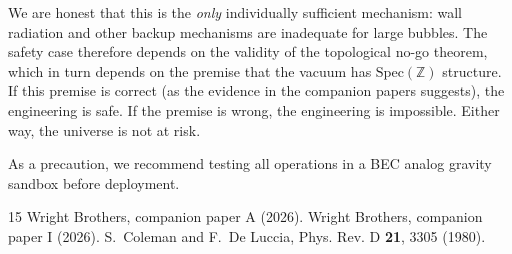 \documentclass[11pt,a4paper]{article}
\newcommand{\Spec}{\mathrm{Spec}}
\begin{document}
We are honest that this is the \emph{only} individually sufficient
mechanism: wall radiation and other backup mechanisms are
inadequate for large bubbles. The safety case therefore depends
on the validity of the topological no-go theorem, which in turn
depends on the premise that the vacuum has $\Spec(\mathbb{Z})$
structure. If this premise is correct (as the evidence in
the companion papers suggests), the engineering is safe.
If the premise is wrong, the engineering is impossible.
Either way, the universe is not at risk.

As a precaution, we recommend testing all operations in a BEC
analog gravity sandbox before deployment.

\begin{thebibliography}{15}
 Wright Brothers, companion paper A (2026).
 Wright Brothers, companion paper I (2026).
 S.~Coleman and F.~De Luccia, Phys. Rev. D \textbf{21}, 3305 (1980).
\end{thebibliography}
\end{document}
